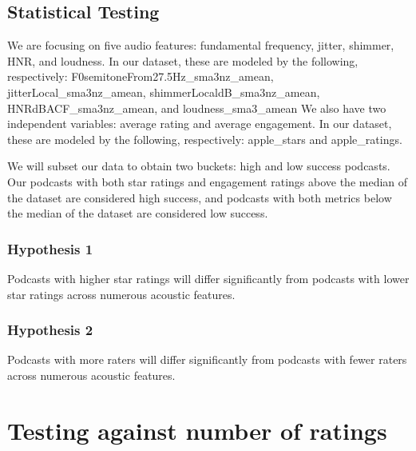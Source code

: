 \documentclass[
]{article}
\begin{document}
\hypertarget{statistical-testing}{%
\subsection{Statistical Testing}\label{statistical-testing}}

We are focusing on five audio features: fundamental frequency, jitter,
shimmer, HNR, and loudness. In our dataset, these are modeled by the
following, respectively: F0semitoneFrom27.5Hz\_sma3nz\_amean,
jitterLocal\_sma3nz\_amean, shimmerLocaldB\_sma3nz\_amean,
HNRdBACF\_sma3nz\_amean, and loudness\_sma3\_amean We also have two
independent variables: average rating and average engagement. In our
dataset, these are modeled by the following, respectively: apple\_stars
and apple\_ratings.

We will subset our data to obtain two buckets: high and low success
podcasts. Our podcasts with both star ratings and engagement ratings
above the median of the dataset are considered high success, and
podcasts with both metrics below the median of the dataset are
considered low success.

\hypertarget{hypothesis-1}{%
\subsubsection{Hypothesis 1}\label{hypothesis-1}}

Podcasts with higher star ratings will differ significantly from
podcasts with lower star ratings across numerous acoustic features.

\hypertarget{hypothesis-2}{%
\subsubsection{Hypothesis 2}\label{hypothesis-2}}

Podcasts with more raters will differ significantly from podcasts with
fewer raters across numerous acoustic features.

\hypertarget{testing-against-number-of-ratings}{%
\section{Testing against number of
ratings}\label{testing-against-number-of-ratings}}
\end{document}
